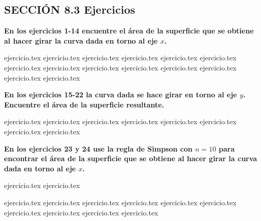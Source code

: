 
\subsection*{SECCIÓN 8.3 \quad Ejercicios}

\noindent\textbf{En los ejercicios 1-14 encuentre el área de la superficie que se obtiene al hacer girar la curva dada en torno al eje $x$.}
\begin{enumerate}
    {ejercicio.tex}
{ejercicio.tex}
{ejercicio.tex}
{ejercicio.tex}
{ejercicio.tex}
{ejercicio.tex}
{ejercicio.tex}
{ejercicio.tex}
{ejercicio.tex}
{ejercicio.tex}
{ejercicio.tex}
{ejercicio.tex}
{ejercicio.tex}
{ejercicio.tex}
\end{enumerate}

\vspace{0.5cm}
\noindent\textbf{En los ejercicios 15-22 la curva dada se hace girar en torno al eje $y$. Encuentre el área de la superficie resultante.}
\begin{enumerate}
    \setcounter{enumi}{14}
    {ejercicio.tex}
{ejercicio.tex}
{ejercicio.tex}
{ejercicio.tex}
{ejercicio.tex}
{ejercicio.tex}
{ejercicio.tex}
{ejercicio.tex}
\end{enumerate}

\vspace{0.5cm}
\noindent\textbf{En los ejercicios 23 y 24 use la regla de Simpson con $n = 10$ para encontrar el área de la superficie que se obtiene al hacer girar la curva dada en torno al eje $x$.}
\begin{enumerate}
    \setcounter{enumi}{22}
    {ejercicio.tex}
{ejercicio.tex}
\end{enumerate}

\vspace{0.5cm}
\begin{enumerate}
    \setcounter{enumi}{24}
    {ejercicio.tex}
{ejercicio.tex}
{ejercicio.tex}
{ejercicio.tex}
{ejercicio.tex}
{ejercicio.tex}
{ejercicio.tex}
{ejercicio.tex}
{ejercicio.tex}
{ejercicio.tex}
\end{enumerate}

